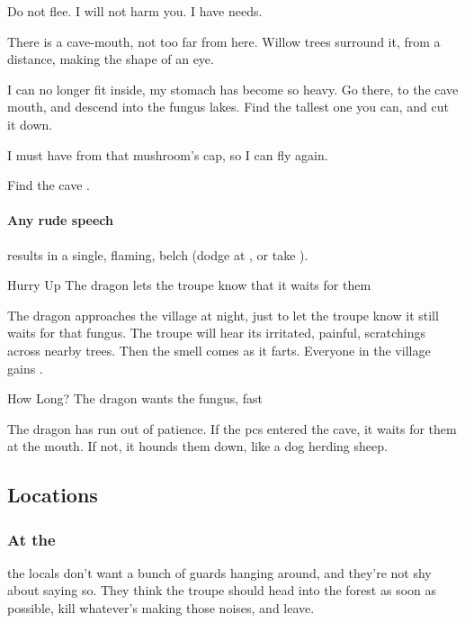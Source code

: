 \documentclass[10pt,twoside]{book}
\begin{document}
\label{irregularWyrm}

\begin{speechtext}
  Do not flee.
  I will not harm you.
  I have needs.

  There is a cave-mouth, not too far from here.
  Willow trees surround it, from a distance, making the shape of an eye.

  I can no longer fit inside, my stomach has become so heavy.
  Go there, to the cave mouth, and descend into the fungus lakes.
  Find the tallest one you can, and cut it down.

  I must have  from that mushroom's cap, so I can fly again.
\end{speechtext}

Find the cave .

\paragraph{Any rude speech}
results in a single, flaming, belch (dodge at \tn, or take ).

\setcounter{diceNo}{1}

\vspace{-2em}
{Hurry Up}%
{The dragon lets the troupe know that it waits for them}%

The dragon approaches the \gls{village} at night, just to let the troupe know it still waits for that fungus.
The troupe will hear its irritated, painful, scratchings across nearby trees.
Then the smell comes as it farts.
Everyone in the \gls{village} gains .

{How Long?}%
{The dragon wants the fungus, fast}%

The dragon has run out of patience.
If the \glspl{pc} entered the cave, it waits for them at the mouth.
If not, it hounds them down, like a dog herding sheep.

\subsection{Locations}

\subsubsection{At the }\label{wyrmBailey}
the locals don't want a bunch of \glspl{guard} hanging around, and they're not shy about saying so.
They think the troupe should head into the forest as soon as possible, kill whatever's making those noises, and leave.
\end{document}
